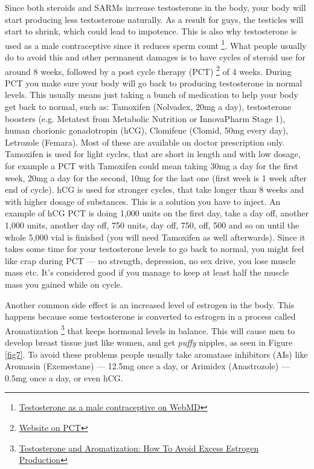 \documentclass[openany, 12pt]{book}
\begin{document}
        Since both steroids and SARMs increase testosterone in the body, your body will start producing less testosterone naturally. As a result for guys, the testicles will start to shrink, which could
        lead to impotence. This is also why testosterone is used as a male contraceptive since it reduces sperm count
        \footnote{\href{https://www.webmd.com/sex/birth-control/news/20090506/testosterone-tested-as-male-contraceptive}{Testosterone as a male contraceptive on WebMD}}.
        What people usually do to avoid this and other permanent damages is to have cycles of steroid use for around 8 weeks, followed by a post cycle therapy (PCT)
        \footnote{\href{https://musclerage.co.uk/supplements-blog/pct-a-comprehensive-guide-to-post-cycle-therapy-2020/}
        {Website on PCT}}
        of 4 weeks. During PCT you make sure your body will go back to producing testosterone in normal levels. This usually means just taking a bunch of medication to help your body get back
        to normal, such as: Tamoxifen (Nolvadex, 20mg a day), testosterone boosters (e.g. Metatest from Metabolic Nutrition or InnovaPharm Stage 1), human chorionic gonadotropin (hCG),
        Clomifene (Clomid, 50mg every day), Letrozole (Femara). Most of these are available on doctor prescription only. Tamoxifen is used for light cycles, that are short in length and with low
        dosage, for example a PCT with Tamoxifen could mean taking 30mg a day for the first week, 20mg a day for the second, 10mg for the last one (first week is 1 week after end of cycle).
        hCG is used for stronger cycles, that take longer than 8 weeks and with higher dosage of substances. This is a solution you have to inject. An example of hCG PCT is doing 1,000 units
        on the first day, take a day off, another 1,000 units, another day off, 750 units, day off, 750, off, 500 and so on until the whole 5,000 vial is finished (you will need
        Tamoxifen as well afterwards).
        Since it takes some time for your testosterone levels to go back to normal, you might feel like crap during PCT --- no strength, depression,
        no sex drive, you lose muscle mass etc. It's considered good if you manage to keep at least half the muscle mass you gained while on cycle.
        
        Another common side effect is an increased level of estrogen in the body. This happens because some testosterone is converted to estrogen in a process called Aromatization
        \footnote{\href{https://www.blaineywellness.com/wp-content/uploads/2016/08/testosterone-and-aromatization-how-to-avoid-excess-estrogrogen-production.pdf}
        {Testosterone and Aromatization: How To Avoid Excess Estrogen Production}} that keeps hormonal levels in balance. This will cause men to develop breast tissue just like women, and get 
        \textit{puffy} nipples, as seen in Figure \ref{fig7}. To avoid these problems people usually take aromatase inhibitors (AIs) like Aromasin (Exemestane) --- 12.5mg once a day, or
        Arimidex (Anastrozole) --- 0.5mg once a day, or even hCG.
\end{document}
